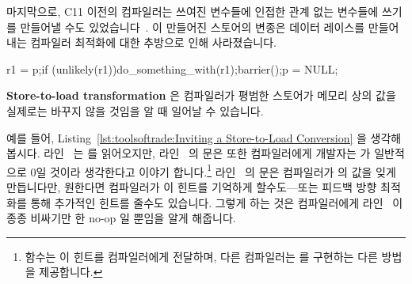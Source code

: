 마지막으로, C11 이전의 컴파일러는 쓰여진 변수들에 인접한 관계 없는 변수들에
쓰기를 만들어낼 수도
있었습니다~\cite[Section 4.2]{Boehm:2005:TCI:1064978.1065042}.
이 만들어진 스토어의 변종은 데이터 레이스를 만들어내는 컴파일러 최적화에 대한
추방으로 인해 사라졌습니다.

\begin{listing}[tbp]
\begin{fcvlabel}
\begin{VerbatimL}[commandchars=\\\[\]]
r1 = p;\lnlbl[load:p]
if (unlikely(r1))\lnlbl[if]
	do_something_with(r1);\lnlbl[dsw]
barrier();\lnlbl[barrier]
p = NULL;\lnlbl[null]
\end{VerbatimL}
\end{fcvlabel}
\caption{Inviting a Store-to-Load Conversion}
\label{lst:toolsoftrade:Inviting a Store-to-Load Conversion}
\end{listing}

{\bf Store-to-load transformation} 은 컴파일러가 평범한 스토어가 메모리 상의
값을 실제로는 바꾸지 않을 것임을 알 때 일어날 수 있습니다.
\begin{fcvref}
예를 들어,
Listing~\ref{lst:toolsoftrade:Inviting a Store-to-Load Conversion}
을 생각해 봅시다.
라인~ 는  를 읽어오지만, 라인~ 의  문은
또한 컴파일러에게 개발자는  가 일반적으로 0일 것이라 생각한다고 이야기
합니다.\footnote{
	 함수는 이 힌트를 컴파일러에게 전달하며, 다른
	컴파일러는  를 구현하는 다른 방법을 제공합니다.}
라인~ 의  문은 컴파일러가  의 값을 잊게
만듭니다만, 원한다면 컴파일러가 이 힌트를 기억하게 할수도---또는 피드백 방향
최적화를 통해 추가적인 힌트를 줄수도 있습니다.
그렇게 하는 것은 컴파일러에게 라인~ 이 종종 비싸기만 한 no-op 일
뿐임을 알게 해줍니다.
\end{fcvref}

\iffalse

